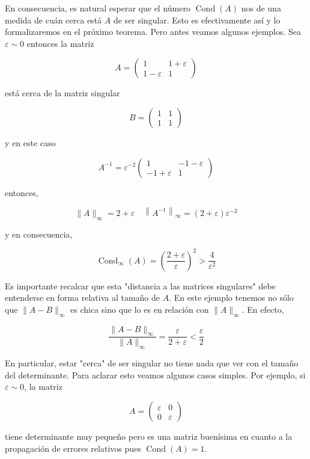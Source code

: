 \documentclass[10pt]{book}
\begin{document}
En consecuencia, es natural esperar que el número $\operatorname{Cond}(A)$ nos de una medida de cuán cerca está $A$ de ser singular. Esto es efectivamente así y lo formalizaremos en el próximo teorema. Pero antes veamos algunos ejemplos. Sea $\varepsilon \sim 0$ entonces la matriz

$$
A=\left(\begin{array}{cc}
1 & 1+\varepsilon \\
1-\varepsilon & 1
\end{array}\right)
$$

está cerca de la matriz singular

$$
B=\left(\begin{array}{ll}
1 & 1 \\
1 & 1
\end{array}\right)
$$

y en este caso

$$
A^{-1}=\varepsilon^{-2}\left(\begin{array}{cc}
1 & -1-\varepsilon \\
-1+\varepsilon & 1
\end{array}\right)
$$

entonces,

$$
\|A\|_{\infty}=2+\varepsilon \quad\left\|A^{-1}\right\|_{\infty}=(2+\varepsilon) \varepsilon^{-2}
$$

y en consecuencia,

$$
\operatorname{Cond}_{\infty}(A)=\left(\frac{2+\varepsilon}{\varepsilon}\right)^{2}>\frac{4}{\varepsilon^{2}}
$$

Es importante recalcar que esta "distancia a las matrices singulares" debe entenderse en forma relativa al tamaño de $A$. En este ejemplo tenemos no sólo que $\|A-B\|_{\infty}$ es chica sino que lo es en relación con $\|A\|_{\infty}$. En efecto,

$$
\frac{\|A-B\|_{\infty}}{\|A\|_{\infty}}=\frac{\varepsilon}{2+\varepsilon}<\frac{\varepsilon}{2}
$$

En particular, estar "cerca" de ser singular no tiene nada que ver con el tamaño del determinante. Para aclarar esto veamos algunos casos simples. Por ejemplo, si $\varepsilon \sim 0$, la matriz

$$
A=\left(\begin{array}{ll}
\varepsilon & 0 \\
0 & \varepsilon
\end{array}\right)
$$

tiene determinante muy pequeño pero es una matriz buenísima en cuanto a la propagación de errores relativos pues $\operatorname{Cond}(A)=1$.
\end{document}
